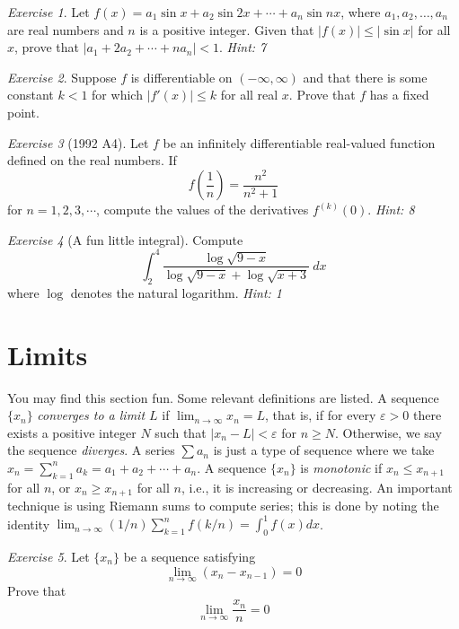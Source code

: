 \documentclass{article}
\theoremstyle{definition}
\theoremstyle{remark}
\newtheorem{exercise}{Exercise}
\newcommand{\eps}{\varepsilon}
\begin{document}
\begin{exercise} Let $f(x)=a_1\sin{x}+a_2\sin{2x}+\cdots + a_n\sin{nx}$, where $a_1,a_2,\dots,a_n$ are real numbers and $n$ is a positive integer. Given that $|f(x)|\leq |\sin{x}|$ for all $x$, prove that $|a_1+2a_2+\cdots+na_n|<1$. \emph{Hint: 7}
\end{exercise}

\begin{exercise}
Suppose $f$ is differentiable on $(-\infty, \infty)$ and that there is some constant $k<1$ for which $|f'(x)|\leq k$ for all real $x$. Prove that $f$ has a fixed point. 
\end{exercise}

\begin{exercise}[1992 A4]
Let $f$ be an infinitely differentiable real-valued function defined on the real numbers. If \[f\left(\frac{1}{n}\right) =\frac{n^2}{n^2+1}\] for $n=1,2,3,\cdots$, compute the values of the derivatives $f^{(k)}(0)$. \emph{Hint: 8}
\end{exercise}

\begin{exercise}[A fun little integral]
Compute
\[\int_2^4 \frac{\log\sqrt{9-x}}{\log\sqrt{9-x}+\log\sqrt{x+3}}\ dx\] where $\log$ denotes the natural logarithm. \emph{Hint: 1}
\end{exercise}

\section{Limits}
You may find this section fun. Some relevant definitions are listed. A sequence $\{x_n\}$ \emph{converges to a limit $L$} if $\lim_{n\to \infty} x_n = L$, that is, if for every $\eps > 0$ there exists a positive integer $N$ such that $|x_n - L| < \eps $ for $n\geq N$. Otherwise, we say the sequence \emph{diverges}. A series $\sum a_n$ is just a type of sequence where we take $x_n = \sum_{k=1}^n a_k=a_1+a_2+\cdots + a_n$. A sequence $\{x_n\}$ is \emph{monotonic} if $x_n \leq x_{n+1}$ for all $n$, or $x_n \geq x_{n+1}$ for all $n$, i.e., it is increasing or decreasing. An important technique is using Riemann sums to compute series; this is done by noting the identity $\lim_{n\to\infty} (1/n)\sum_{k=1}^n f(k/n) = \int_0^1 f(x)dx$.

\begin{exercise}
Let $\{x_n\}$ be a sequence satisfying \[\lim_{n\to\infty} (x_n-x_{n-1}) = 0\] Prove that \[\lim_{n\to\infty} \frac{x_n}{n}= 0\]
\end{exercise}
\end{document}
